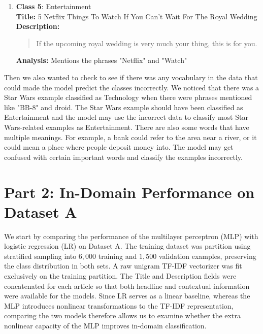 \documentclass[letterpaper,conference,compsoc,onecolumn]{IEEEtran}
\begin{document}
\begin{enumerate}
    \item \textbf{Class 5}: Entertainment\\
    \textbf{Title:} 5 Netflix Things To Watch If You Can't Wait For The Royal
    Wedding\\
    \textbf{Description:}
    \begin{quote}
        \small
        If the upcoming royal wedding is very much your thing, this is for you.
    \end{quote}
    \textbf{Analysis:} Mentions the phrases "Netflix" and "Watch"
\end{enumerate}

Then we also wanted to check to see if there was any vocabulary in the data that could made the model predict the classes incorrectly. 
We noticed that there was a Star Wars example classified as Technology when there were phrases mentioned like "BB-8" and droid. The Star Wars example should have been classified as Entertainment and the model may use the incorrect data to classify most Star Wars-related examples as Entertainment.
There are also some words that have multiple meanings. For example, a bank could refer to the area near a river, or it could mean a place where people deposit money into. The model may get confused with certain important words and classify the examples incorrectly.

\section{Part 2: In-Domain Performance on Dataset A}

We start by comparing the performance of the multilayer perceptron (MLP) with logistic regression (LR) on Dataset A.
The training dataset was partition using stratified sampling into $6,000$ training and $1,500$ validation examples, preserving the class distribution in both sets.
A raw unigram TF-IDF vectorizer was fit exclusively on the training partition.
The Title and Description fields were concatenated for each article so that both headline and contextual information were available for the models. Since LR serves as a linear baseline, whereas the MLP introduces nonlinear transformations to the TF-IDF representation, comparing the two models therefore allows us to examine whether the extra nonlinear capacity of the MLP improves in-domain classification.
\end{document}
